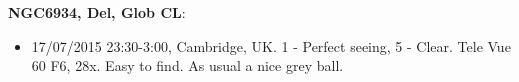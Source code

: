 {\bf NGC6934, Del, Glob CL}:
\begin{itemize}
\item 17/07/2015 23:30-3:00, Cambridge, UK. 1 - Perfect seeing, 5 - Clear. Tele Vue 60 F6, 28x. Easy to find. As usual a nice grey ball.
\end{itemize}
